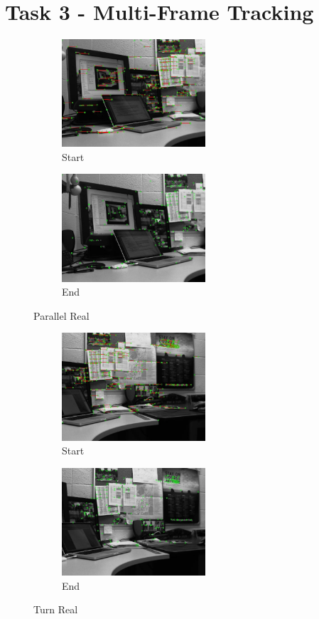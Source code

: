 \documentclass[11pt,a4paper]{report}
\begin{document}
\section*{Task 3 - Multi-Frame Tracking}

\begin{figure}[H]
\centering
\begin{subfigure}{.5\textwidth}
  \centering
  \includegraphics[height=4cm,keepaspectratio]{outParaRealStart}
  \caption{Start}
  \label{fig:sub1}
\end{subfigure}%
\begin{subfigure}{.5\textwidth}
  \centering
  \includegraphics[height=4cm,keepaspectratio]{outParaRealEnd}
  \caption{End}
  \label{fig:sub2}
\end{subfigure}
\label{fig:test}
\caption{Parallel Real}
\end{figure}

\begin{figure}[H]
\centering
\begin{subfigure}{.5\textwidth}
  \centering
  \includegraphics[height=4cm,keepaspectratio]{outTurnRealStart}
  \caption{Start}
  \label{fig:sub1}
\end{subfigure}%
\begin{subfigure}{.5\textwidth}
  \centering
  \includegraphics[height=4cm,keepaspectratio]{outTurnRealEnd}
  \caption{End}
  \label{fig:sub2}
\end{subfigure}
\label{fig:test}
\caption{Turn Real}
\end{figure}
\end{document}
